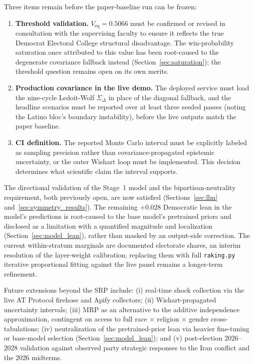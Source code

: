 \documentclass[12pt, letterpaper]{article}
\theoremstyle{definition}
\newcommand{\Veq}{V_{\mathrm{eq}}}
\newcommand{\SigmaDelta}{\Sigma_{\Delta}}
\begin{document}
Three items remain before the paper-baseline run can be frozen:
\begin{enumerate}
  \item \textbf{Threshold validation.} $\Veq = 0.5066$ must be confirmed or
    revised in consultation with the supervising faculty to ensure it reflects
    the true Democrat Electoral College structural disadvantage. The
    win-probability saturation once attributed to this value has been
    root-caused to the degenerate covariance fallback instead
    (Section~\ref{sec:saturation}); the threshold question remains open on
    its own merits.

  \item \textbf{Production covariance in the live demo.} The deployed service must
    load the nine-cycle Ledoit-Wolf $\SigmaDelta$ in place of the diagonal fallback,
    and the headline scenarios must be reported over at least three seeded passes
    (noting the Latino bloc's boundary instability), before the live outputs match
    the paper baseline.

  \item \textbf{CI definition.} The reported Monte Carlo interval must be
    explicitly labeled as sampling precision rather than covariance-propagated
    epistemic uncertainty, or the outer Wishart loop must be implemented. This
    decision determines what scientific claim the interval supports.
\end{enumerate}

The directional validation of the Stage~1 model and the bipartisan-neutrality
requirement, both previously open, are now satisfied (Sections~\ref{sec:llm}
and~\ref{sec:symmetry_results}). The remaining $+0.028$ Democratic lean in the
model's predictions is root-caused to the base model's pretrained priors and
disclosed as a limitation with a quantified magnitude and localization
(Section~\ref{sec:model_lean}), rather than masked by an output-side
correction. The current within-stratum marginals are documented
electorate shares, an interim resolution of the layer-weight calibration; replacing them
with full \texttt{raking.py} iterative proportional fitting against the live panel
remains a longer-term refinement.

Future extensions beyond the SRP include: (i) real-time shock collection via
the live AT Protocol firehose and Apify collectors; (ii) Wishart-propagated
uncertainty intervals; (iii) MRP as an alternative to the additive independence
approximation, contingent on access to full race $\times$ religion $\times$
gender cross-tabulations; (iv) neutralization of the pretrained-prior lean via
heavier fine-tuning or base-model selection (Section~\ref{sec:model_lean});
and (v) post-election 2026--2028 validation against observed party strategic
responses to the Iran conflict and the 2026 midterms.
\end{document}
